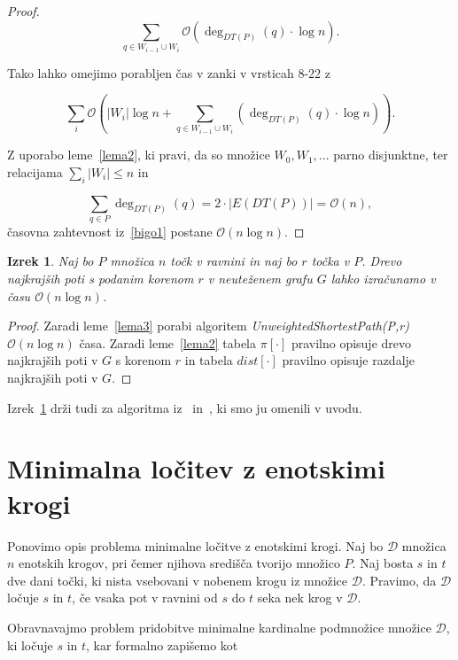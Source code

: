 \documentclass[a4paper, 12pt]{book}
\newcommand{\D}{\ensuremath{\mathcal{D}}}
\newcommand{\OO}{\ensuremath{\mathcal{O}}} %
\newtheorem{izrek}{Izrek}[chapter]
\begin{document}
\begin{proof}
\begin{equation*}
\sum_{q\in W_{i-1}\cup W_i} \OO(\deg_{DT(P)}(q) \cdot \log n).
\end{equation*}

Tako lahko omejimo porabljen čas v zanki v vrsticah 8-22 z

\begin{equation}
\label{bigo1}
\sum_i \OO \left( |W_i|\log n + \sum_{q\in W_{i-1}\cup W_i} (\deg_{DT(P)}(q) \cdot \log n) \right) .
\end{equation}

Z uporabo leme~\ref{lema2}, ki pravi, da so množice $W_0,W_1,...$ parno disjunktne, ter relacijama $\sum_i |W_i| \leq n$ in 

\begin{equation*}
\sum_{q \in P} \deg_{DT(P)}(q) = 2 \cdot |E(DT(P))| = \OO(n),
\end{equation*}
časovna zahtevnost iz~\ref{bigo1} postane $\OO(n\log n)$.
\end{proof}

\begin{izrek}
\label{ssspIzrek}
Naj bo $P$ množica $n$ točk v ravnini in naj bo $r$ točka v $P$. Drevo najkrajših poti s podanim korenom $r$ v neuteženem grafu $G$ lahko izračunamo v času $\OO(n\log n)$.
\end{izrek}

\begin{proof}
Zaradi leme~\ref{lema3} porabi algoritem \textit{UnweightedShortestPath(P,r)} $\OO(n\log n)$ časa. Zaradi leme~\ref{lema2} tabela $\pi[\cdot]$ pravilno opisuje drevo najkrajših poti v $G$ s korenom $r$ in tabela $dist[\cdot]$ pravilno opisuje razdalje najkrajših poti v $G$.
\end{proof}
\afterpage{\FloatBarrier}

Izrek~\ref{ssspIzrek} drži tudi za algoritma iz~\cite{eik-01} in~\cite{ChanS16}, ki smo ju omenili v uvodu.

\section{Minimalna ločitev z enotskimi krogi}
Ponovimo opis problema minimalne ločitve z enotskimi krogi.
Naj bo $\D$ množica $n$ enotskih krogov, pri čemer njihova središča tvorijo množico $P$. Naj bosta $s$ in $t$ dve dani točki, ki nista vsebovani v nobenem krogu iz množice $\D$. Pravimo, da $\D$ ločuje $s$ in $t$, če vsaka pot v ravnini od $s$ do $t$ seka nek krog v $\D$.

Obravnavajmo problem pridobitve minimalne kardinalne podmnožice mno\-ži\-ce $\D$, ki ločuje $s$ in $t$, kar formalno zapišemo kot 
\end{document}
